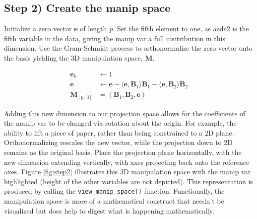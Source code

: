 \hypertarget{step-2-create-the-manip-space}{%
\subsection{Step 2) Create the manip
space}\label{step-2-create-the-manip-space}}

Initialize a zero vector \textbf{e} of length \emph{p}. Set the fifth
element to one, as aede2 is the fifth variable in the data, giving the
manip var a full contribution in this dimension. Use the Gram-Schmidt
process to orthonormalize the zero vector onto the basis yielding the 3D
manipulation space, \textbf{M}.

\begin{align*}
  \textbf{e}_k &\leftarrow 1 \\ 
  \textbf{e}   &\leftarrow \textbf{e} - \langle \textbf{e}, \textbf{B}_1 \rangle \textbf{B}_1 - \langle \textbf{e}, \textbf{B}_2 \rangle \textbf{B}_2 \\ 
  \textbf{M}_{[p,~3]} &= (\textbf{B}_1,\textbf{B}_2,\textbf{e})
\end{align*}

Adding this new dimension to our projection space allows for the
coefficients of the manip var to be changed via rotation about the
origin. For example, the ability to lift a piece of paper, rather than
being constrained to a 2D plane. Orthonormalizing rescales the new
vector, while the projection down to 2D remains as the original basis.
Place the projection plane horizontally, with the new dimension
extending vertically, with axes projecting back onto the reference axes.
Figure \ref{fig:step2} illustrates this 3D manipulation space with the
manip var highlighted (height of the other variables are not depicted).
This representation is produced by calling the
\texttt{view\_manip\_space()} function. Functionally, the manipulation
space is more of a mathematical construct that needn't be visualized but
does help to digest what is happening mathematically.

